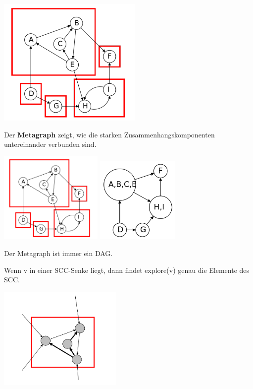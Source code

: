 \begin{frame}[fragile] 

\includegraphics[width=7cm]{bild14.png}
\end{frame}

\begin{frame}[fragile] 
Der \textbf{Metagraph} zeigt, wie die starken Zusammenhangskomponenten untereinander verbunden sind.

\includegraphics[width=5cm]{bild14.png}
\includegraphics[width=4cm]{bild15.png}

Der Metagraph ist immer ein DAG.
\end{frame}

\begin{frame}[fragile] 
Wenn v in einer SCC-Senke liegt, dann findet explore(v) genau die Elemente des SCC.

\includegraphics[width=6cm]{bild16.png}
\end{frame}

